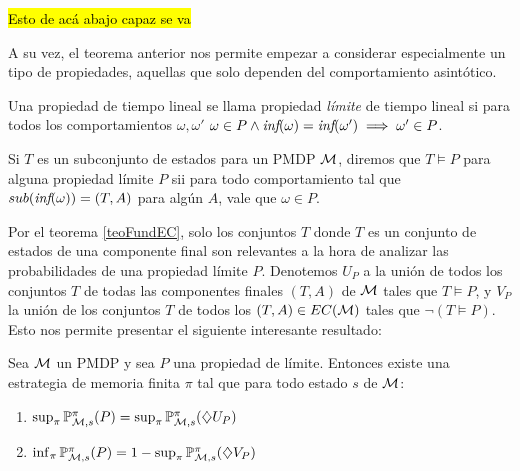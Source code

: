 \hl{Esto de acá abajo capaz se va}

A su vez, el teorema anterior nos permite empezar a considerar especialmente un
tipo de propiedades, aquellas que solo dependen del comportamiento asintótico.

\begin{definition}
	Una propiedad de tiempo lineal se llama propiedad \textit{límite} de tiempo lineal si para todos los comportamientos $\omega, \omega'$ $\omega \in P \wedge \textit{inf}(\omega) = \textit{inf}(\omega') \implies \omega' \in P$.

	Si $T$ es un subconjunto de estados para un PMDP $\mathcal{M}$, diremos que $T \models
		P$ para alguna propiedad límite $P$ sii para todo comportamiento tal que
	$sub(\textit{inf}(\omega)) = (T,A)$ para algún $A$, vale que $\omega \in P$.
\end{definition}

Por el teorema \ref{teoFundEC}, solo los conjuntos $T$ donde $T$ es un conjunto
de estados de una componente final son relevantes a la hora de analizar las
probabilidades de una propiedad límite $P$. Denotemos $U_P$ a la unión de todos
los conjuntos $T$ de todas las componentes finales $(T,A)$ de $\mathcal{M}$ tales que $T
	\models P$, y $V_P$ la unión de los conjuntos $T$ de todos los $(T,A) \in
	EC(\mathcal{M})$ tales que $\neg (T \models P)$. Esto nos permite presentar el siguiente
interesante resultado:


\begin{theorem}
	\label{rabinAlcPMDP}
	Sea $\mathcal{M}$ un PMDP y sea $P$ una propiedad de límite. Entonces existe una estrategia de memoria finita $\pi$ tal que para todo estado $s$ de $\mathcal{M}$:

	\begin{enumerate}[label=(\alph*)]
		\item $\sup_{\pi} \mathbb{P}_{\mathcal{M}, s}^\pi (P) = \sup_{\pi} \mathbb{P}_{\mathcal{M}, s}^\pi (\diamondsuit U_P)$

		\item $\inf_{\pi} \mathbb{P}_{\mathcal{M}, s}^\pi (P) = 1 - \sup_{\pi} \mathbb{P}_{\mathcal{M}, s}^\pi (\diamondsuit V_P)$
	\end{enumerate}
\end{theorem}

